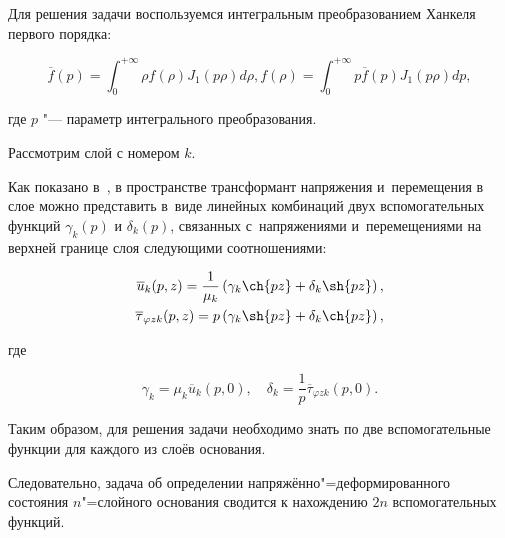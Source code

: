 \smallskip



 Для решения задачи воспользуемся интегральным преобразованием Ханкеля первого порядка:

\begin{equation*}

\overline{f}(p)=\int_{0}^{+\infty}\rho f(\rho)J_{1}(p

\rho)d\rho, f(\rho)=\int_{0}^{+\infty}p \overline{f}(p)

J_{1}(p \rho)dp,

\end{equation*}

где $p$ "--- параметр интегрального преобразования.



Рассмотрим слой с номером $k$. 

Как показано в~\cite{antvel:bib:VelSteg-ru}, в пространстве трансформант напряжения и~перемещения в слое можно представить в~виде линейных комбинаций двух вспомогательных функций $\gamma_{k}(p)$ и $\delta_{k}(p)$, связанных с~напряжениями и~перемещениями на верхней границе слоя следующими соотношениями:

\begin{eqnarray}

\overline{u}_{k}(p,z)=\frac{1}{\mu_{k}}\left(\gamma_{k}\ch{pz}+\delta_{k} \sh{pz}\right),

\label{eq:kov:antvel4} \\

\overline{\tau}_{\varphi z k}(p,z)=p \left(\gamma_{k}\sh{pz}+\delta_{k} \ch{pz}\right) ,

\label{eq:kov:antvel5}

\end{eqnarray}

где

\begin{equation}

\gamma_{k}=\mu_{k} \overline{u}_{k}(p, 0), \quad  \delta_{k}= \frac{1}{p} \overline{\tau}_{\varphi z k}(p, 0). \label{eq:kov:antvel6}

\end{equation}



Таким образом, для решения задачи необходимо знать по две вспомогательные функции для каждого из слоёв основания. 

Следовательно, задача об определении напряжённо"=деформированного состояния $n$"=слойного основания сводится к нахождению $2n$ вспомогательных функций. 

